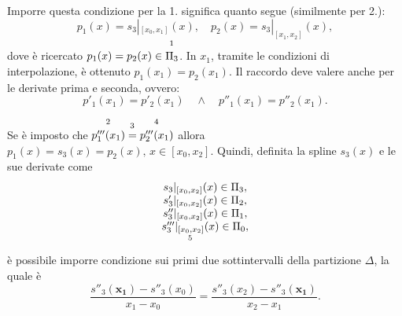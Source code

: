 Imporre questa condizione per la 1. significa quanto segue (similmente per 2.):
\begin{equation*}
    p_1(x)=s_3|_{[x_0,x_1]}(x),\quad p_2(x)=s_3|_{[x_1,x_2]}(x),
\end{equation*}
dove è ricercato $p_1(x)=p_2(x)\in\overset{\footnotemark}{\Pi_3}$. In $x_1$, tramite le condizioni di interpolazione, è ottenuto $p_1(x_1)=p_2(x_1)$. Il raccordo deve valere anche per le derivate prima e seconda, ovvero:
\begin{equation*}
    p'_1(x_1)=p'_2(x_1)\quad\land\quad p''_1(x_1)=p''_2(x_1).
\end{equation*}

Se è imposto che $\overset{\footnotemark}{p'''_1(x_1)}\overset{\footnotemark}{=}\overset{\footnotemark}{p'''_2(x_1)}$ allora $p_1(x)=s_3(x)=p_2(x),\, x\in [x_0,x_2]$. Quindi, definita la spline $s_3(x)$ e le sue derivate come 
\begin{equation*}
    \begin{matrix}
        s_3|_{[x_0,x_2]}(x)\in\Pi_3,\\
        s'_3|_{[x_0,x_2]}(x)\in\Pi_2,\\
        s''_3|_{[x_0,x_2]}(x)\in\Pi_1,\\
        \underset{\footnotemark}{s'''_3|_{[x_0,x_2]}(x)}\in\Pi_0,
    \end{matrix}
\end{equation*}
è possibile imporre condizione sui primi due sottintervalli della partizione $\Delta$, la quale è
\begin{equation*}
    \boxed{\frac{s''_3(\boldsymbol{x_1})-s''_3(x_0)}{x_1-x_0}=\frac{s''_3(x_2)-s''_3(\boldsymbol{x_1})}{x_2-x_1}.}
\end{equation*}

\addtocounter{footnote}{-3}




